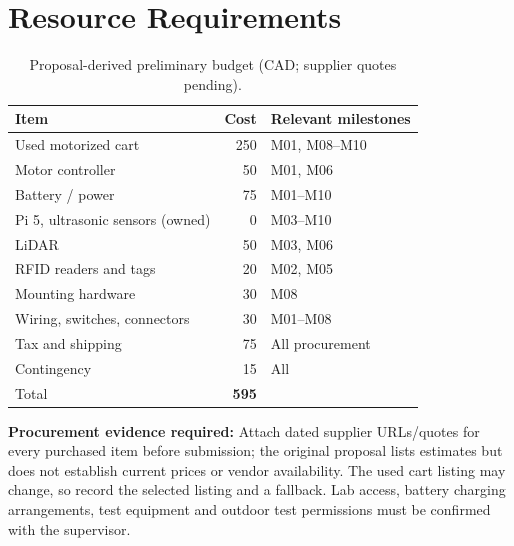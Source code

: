 \section{Resource Requirements}
\begin{table}[ht]\centering\small\caption{Proposal-derived preliminary budget (CAD; supplier quotes pending).}\begin{tabularx}{\linewidth}{X r l}\toprule Item & Cost & Relevant milestones\\\midrule Used motorized cart & 250 & M01, M08--M10\\ Motor controller & 50 & M01, M06\\ Battery / power & 75 & M01--M10\\ Pi 5, ultrasonic sensors (owned) & 0 & M03--M10\\ LiDAR & 50 & M03, M06\\ RFID readers and tags & 20 & M02, M05\\ Mounting hardware & 30 & M08\\ Wiring, switches, connectors & 30 & M01--M08\\ Tax and shipping & 75 & All procurement\\ Contingency & 15 & All\\\midrule Total & \textbf{595} &\\\bottomrule\end{tabularx}\end{table}
\textbf{Procurement evidence required:} Attach dated supplier URLs/quotes for every purchased item before submission; the original proposal lists estimates but does not establish current prices or vendor availability. The used cart listing may change, so record the selected listing and a fallback. Lab access, battery charging arrangements, test equipment and outdoor test permissions must be confirmed with the supervisor.\par
